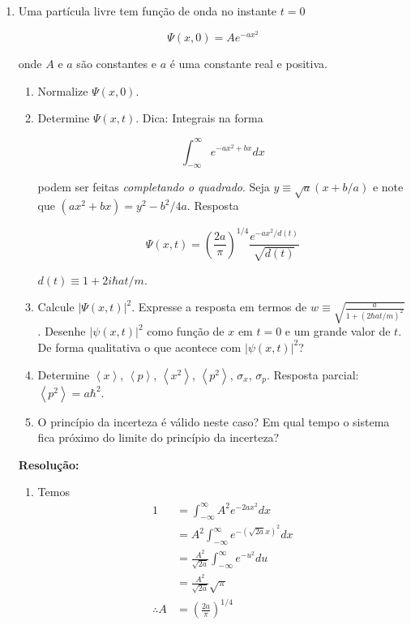 \documentclass[a4paper, 12pt, notitlepage]{article}
\begin{document}
\begin{enumerate}
\begin{enumerate}
    
  \end{enumerate}
  
  

\item Uma partícula livre tem função de onda no instante $t=0$

  \begin{equation*}
  \Psi(x, 0) = Ae^{-ax^2}
  \end{equation*}
  
  \noindent onde $A$ e $a$ são constantes e $a$ é uma constante real e positiva.
  
  \begin{enumerate}
    \item Normalize $\Psi(x, 0)$.
    \item Determine $\Psi(x, t)$. Dica: Integrais na forma
    
    \begin{equation*}
    \int_{-\infty}^{\infty}e^{-ax^2 + bx}dx
    \end{equation*}
    
    \noindent podem ser feitas \textit{completando o quadrado}. Seja $y \equiv \sqrt{a}(x + b/a)$ e note que $(ax^2 + bx) = y^2 - b^2/4a$. Resposta
    
    \begin{equation*}
    \Psi(x,t) = \left(\frac{2a}{\pi}\right)^{1/4} \frac{e^{-ax^2/d(t)}}{\sqrt{d(t)}}
    \end{equation*}
    
    \noindent $d(t) \equiv 1 + 2i\hbar at/m$.
    
    \item Calcule $|\Psi(x, t)|^2$.
    Expresse a resposta em termos de $w \equiv \sqrt{\frac{a}{1 + \left(2\hbar at/m\right)^2}}$.
    Desenhe $|\psi(x,t)|^2$ como função de $x$ em $t=0$ e um grande valor de $t$. De forma qualitativa o que acontece com $|\psi(x,t)|^2$?
    \item Determine $\left\langle x \right\rangle$, $\left\langle p \right\rangle$, $\left\langle x^2 \right\rangle$, $\left\langle p^2 \right\rangle$, $\sigma_x$, $\sigma_p$.
    Resposta parcial: $\left\langle p^2 \right\rangle = a\hbar^2$.
    \item O princípio da incerteza é válido neste caso? Em qual tempo o sistema fica próximo do limite do princípio da incerteza?
  \end{enumerate}

\textbf{Resolução: }
\begin{enumerate}
  \item Temos
  \begin{align*}
  1 &= \int_{-\infty}^{\infty} A^2 e^{-2ax^2} dx \\
  &= A^2 \int_{-\infty}^{\infty} e^{-(\sqrt{2a}x)^2} dx \\
  &= \frac{A^2}{\sqrt{2a}} \int_{-\infty}^{\infty} e^{-u^2} du \\
  &= \frac{A^2}{\sqrt{2a}} \sqrt{\pi} \\
  \therefore A &= \left(\frac{2a}{\pi}\right)^{1/4}
  \end{align*}
  

\end{enumerate}
\end{enumerate}
\end{document}
